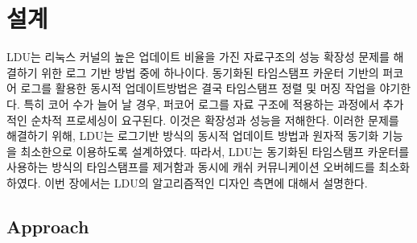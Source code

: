 \section{설계}
\label{sec:ldu}



LDU는 리눅스 커널의 높은 업데이트 비율을 가진 자료구조의 성능 확장성 문제를 
해결하기 위한 로그 기반 방법 중에 하나이다.
동기화된 타임스탬프 카운터 기반의 퍼코어 로그를 활용한 동시적 업데이트방법은 결국 
타임스탬프 정렬 및 머징 작업을 야기한다.
특히 코어 수가 늘어 날 경우, 퍼코어 로그를 자료 구조에 적용하는 과정에서 추가적인 순차적 프로세싱이 요구된다.
이것은 확장성과 성능을 저해한다. 
이러한 문제를 해결하기 위해, LDU는 로그기반 방식의 동시적 업데이트 방법과 
원자적 동기화 기능을 최소한으로 이용하도록 설계하였다.
따라서, LDU는 동기화된 타임스탬프 카운터를 사용하는 방식의 타임스탬프를
제거함과 동시에 캐쉬 커뮤니케이션 오버헤드를 최소화 하였다.
이번 장에서는 LDU의 알고리즘적인 디자인 측면에 대해서 설명한다. 

\subsection{Approach}


